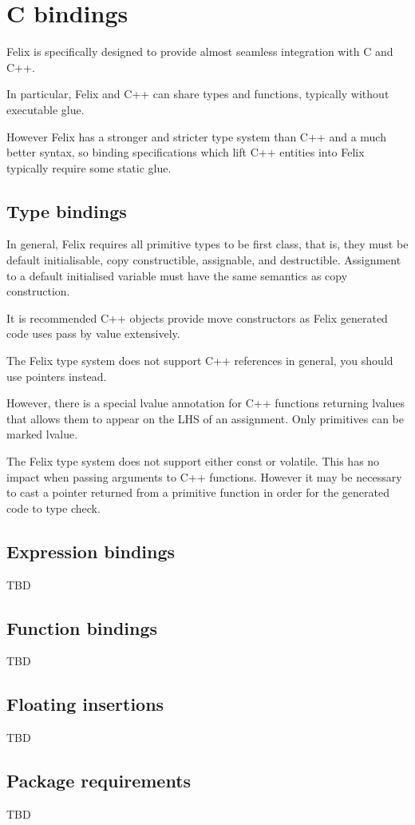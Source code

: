 \documentclass[oneside]{book}
\begin{document}
\chapter{C bindings}
Felix is specifically designed to provide almost seamless integration
with C and C++.

In particular, Felix and C++ can share types and functions,
typically without executable glue.

However Felix has a stronger and stricter type system than C++
and a much better syntax, so binding specifications which lift
C++ entities into Felix typically require some static glue.

\section{Type bindings}
In general, Felix requires all primitive types to be first class,
that is, they must be default initialisable, copy constructible,
assignable, and destructible. Assignment to a default initialised
variable must have the same semantics as copy construction.

It is recommended C++ objects provide move constructors as
Felix generated code uses pass by value extensively.

The Felix type system does not support C++ references in general,
you should use pointers instead. 

However, there is a special lvalue annotation for C++ functions
returning lvalues that allows them to appear on the LHS of
an assignment. Only primitives can be marked lvalue.

The Felix type system does not support either const or volatile.
This has no impact when passing arguments to C++ functions.
However it may be necessary to cast a pointer returned from
a primitive function in order for the generated code to type check.



\section{Expression bindings}
TBD
\section{Function bindings}
TBD
\section{Floating insertions}
TBD
\section{Package requirements}
TBD
\end{document}
